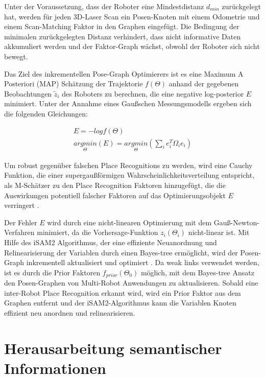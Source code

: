 Unter der Voraussetzung, dass der Roboter eine Mindestdistanz $ d_{min} $ zurückgelegt hat, werden für jeden 3D-Laser Scan ein Posen-Knoten mit einem Odometrie und einem Scan-Matching Faktor in den Graphen eingefügt. Die Bedingung der minimalen zurückgelegten Distanz verhindert, dass nicht informative Daten akkumuliert werden und der Faktor-Graph wächst, obwohl der Roboter sich nicht bewegt. 

Das Ziel des inkrementellen Pose-Graph Optimierers ist es eine Maximum A Posteriori (MAP) Schätzung der Trajektorie $ f(\Theta) $ anhand der gegebenen Beobachtungen $ \tilde{z}_i $ des Roboters zu berechnen, die eine negative log-posterior $ E $  minimiert. Unter der Annahme eines Gaußschen Messungsmodells ergeben sich die folgenden Gleichungen:


\begin{eqnarray}
    E = -log f(\Theta) \\
    \underset{\Theta}{arg min}(E) = \underset{\Theta}{arg min}(\sum_ie_i^T\Omega_ie_i)
\end{eqnarray}

Um robust gegenüber falschen Place Recognitions zu werden, wird eine Cauchy Funktion, die einer supergaußförmigen Wahrscheinlichkeitsverteilung entspricht, als M-Schätzer zu den Place Recognition Faktoren hinzugefügt, die die Auswirkungen potentiell falscher Faktoren auf das Optimierungsobjekt $ E $ verringert \cite{Lee2013}.

Der Fehler $ E $ wird durch eine nicht-linearen Optimierung mit dem Gauß-Newton-Verfahren minimiert, da die Vorhersage-Funktion $ z_i(\Theta_i) $ nicht-linear ist. Mit Hilfe des iSAM2 Algorithmus, der eine effiziente Neuanordnung und Relinearisierung der Variablen durch einen Bayes-tree ermöglicht, wird der Posen-Graph inkrementell aktualisiert und optimiert \cite{Kaess2012}. Da weak links verwendet werden, ist es durch die Prior Faktoren $ f_{prior}(\Theta_0) $ möglich, mit dem Bayes-tree Ansatz den Posen-Graphen von Multi-Robot Anwendungen zu aktualisieren. Sobald eine inter-Robot Place Recognition erkannt wird, wird ein Prior Faktor aus dem Graphen entfernt und der iSAM2-Algorithmus kann die Variablen Knoten effizient neu anordnen und relinearisieren. 


\section[Herausarbeitung semantischer Informationen (Kopp)]{Herausarbeitung semantischer Informationen}

